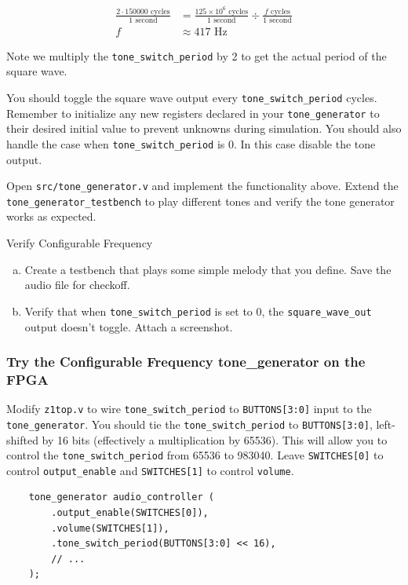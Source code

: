 \documentclass[11pt]{article}
\begin{document}
\begin{align*}
  \frac{2 \cdot 150000 \text{ cycles}}{1 \text{ second}} &= \frac{125 \times 10^6 \text{ cycles}}{1 \text{ second}} \div \frac{f \text{ cycles}}{1 \text{ second}} \\
  f &\approx 417 \text{ Hz}
\end{align*}

Note we multiply the \verb|tone_switch_period| by 2 to get the actual period of the square wave.

You should toggle the square wave output every \verb|tone_switch_period| cycles.
Remember to initialize any new registers declared in your \verb|tone_generator| to their desired initial value to prevent unknowns during simulation.
You should also handle the case when \verb|tone_switch_period| is 0. In this case disable the tone output.

Open \verb|src/tone_generator.v| and implement the functionality above.
Extend the \verb|tone_generator_testbench| to play different tones and verify the tone generator works as expected.

\begin{texexptitled}{Verify Configurable Frequency}{}
  \begin{enumerate}[a)]
    \item Create a testbench that plays some simple melody that you define. Save the audio file for checkoff.
    \item Verify that when \verb|tone_switch_period| is set to 0, the \verb|square_wave_out| output doesn't toggle. Attach a screenshot.
  \end{enumerate}
\end{texexptitled}

\subsubsection{Try the Configurable Frequency tone\_generator on the FPGA}
Modify \verb|z1top.v| to wire \verb|tone_switch_period| to \verb|BUTTONS[3:0]|
input to the \verb|tone_generator|. You should tie the \verb|tone_switch_period| to \verb|BUTTONS[3:0]|, left-shifted by 16 bits (effectively a multiplication by 65536).
This will allow you to control the \verb|tone_switch_period| from 65536 to 983040.
Leave \verb|SWITCHES[0]| to control \verb|output_enable| and \verb|SWITCHES[1]| to control \verb|volume|.

\begin{verbatim}
    tone_generator audio_controller (
        .output_enable(SWITCHES[0]),
        .volume(SWITCHES[1]),
        .tone_switch_period(BUTTONS[3:0] << 16),
        // ...
    );
\end{verbatim}
\end{document}
